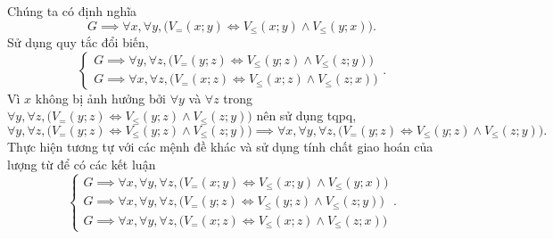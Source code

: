 \resetSubexercise Chúng ta có định nghĩa
\begin{equation*}
   G \implies \forall x, \forall y, \big(V_=(x; y) \iff V_\le(x; y) \land V_\le(y; x)\big).
\end{equation*}
Sử dụng quy tắc đổi biến,
\begin{equation*}
   \begin{cases}
      G \implies \forall y, \forall z, \big(V_=(y; z) \iff V_\le(y; z) \land V_\le(z; y)\big) \\
      G \implies \forall x, \forall z, \big(V_=(x; z) \iff V_\le(x; z) \land V_\le(z; x)\big) 
   \end{cases}.
\end{equation*}
Vì $x$ không bị ảnh hưởng bởi $\forall y$ và $\forall z$ trong $\forall y, \forall z, \big(V_=(y; z) \iff V_\le(y; z) \land V_\le(z; y)\big)$ nên sử dụng tqpq,
\begin{equation*}
   \forall y, \forall z, \big(V_=(y; z) \iff V_\le(y; z) \land V_\le(z; y)\big) \implies \forall x, \forall y, \forall z, \big(V_=(y; z) \iff V_\le(y; z) \land V_\le(z; y)\big).
\end{equation*}
Thực hiện tương tự với các mệnh đề khác và sử dụng tính chất giao hoán của lượng từ để có các kết luận
\begin{equation}
   \begin{cases}
      G \implies \forall x, \forall y, \forall z, \big(V_=(x; y) \iff V_\le(x; y) \land V_\le(y; x)\big) \\
      G \implies \forall x, \forall y, \forall z, \big(V_=(y; z) \iff V_\le(y; z) \land V_\le(z; y)\big) \\
      G \implies \forall x, \forall y, \forall z, \big(V_=(x; z) \iff V_\le(x; z) \land V_\le(z; x)\big) 
   \end{cases}.
   \label{eq:nen_tang_lo_gich:giai_tich_vi_tu_bac_nhat:quy_tac_suy_luan:3_1}
\end{equation}

